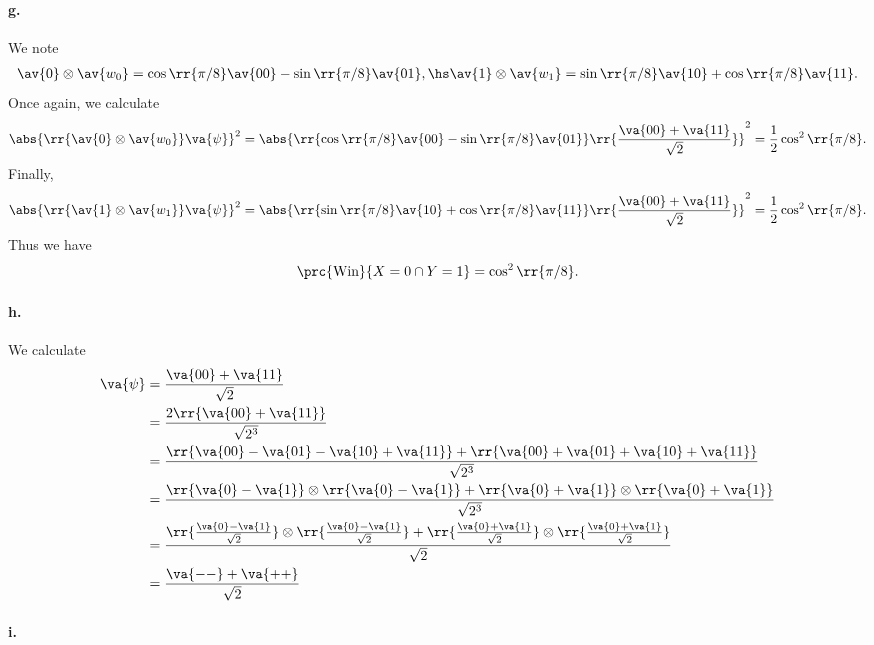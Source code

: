 \documentclass{article}
\begin{document}
\paragraph{g.} We note
\begin{align*}
  \av{0}\otimes \av{w_0} = \cos\rr{\pi/8} \av{00} - \sin\rr{\pi/8}\av{01} , \hs
  \av{1}\otimes \av{w_1} = \sin\rr{\pi/8}\av{10} + \cos\rr{\pi/8} \av{11}.
\end{align*}
Once again, we calculate
\begin{align*}
  \abs{\rr{\av{0}\otimes\av{w_0}}\va{\psi}}^2
  = \abs{\rr{\cos\rr{\pi/8} \av{00} - \sin\rr{\pi/8}\av{01}}\rr{\frac{\va{00}+\va{11}}{\sqrt{2}}}}^2
  =\frac{1}{2}\cos^2\rr{\pi/8}.
\end{align*}
Finally,
\begin{align*}
  \abs{\rr{\av{1}\otimes\av{w_1}}\va{\psi}}^2
  = \abs{\rr{\sin\rr{\pi/8}\av{10} + \cos\rr{\pi/8} \av{11}}\rr{\frac{\va{00}+\va{11}}{\sqrt{2}}}}^2
  =\frac{1}{2}\cos^2\rr{\pi/8}.
\end{align*}
Thus we have
\begin{align*}
  \prc{\text{Win}}{X=0\cap Y=1} = \cos^2\rr{\pi/8}.
\end{align*}

\paragraph{h.}

We calculate
\begin{align*}
  \va{\psi}
  &= \frac{\va{00} + \va{11}}{\sqrt{2}} \\
  &= \frac{2\rr{\va{00} + \va{11}}}{\sqrt{2^3}} \\
  &= \frac{\rr{\va{00}-\va{01}-\va{10}+\va{11}} + \rr{\va{00}+\va{01}+\va{10}+\va{11}}}{\sqrt{2^3}} \\
  &= \frac{\rr{\va{0}-\va{1}}\otimes \rr{\va{0}-\va{1}} + \rr{\va{0}+\va{1}}\otimes \rr{\va{0}+\va{1}}}{\sqrt{2^3}} \\
  &= \frac{\rr{\frac{\va{0}-\va{1}}{\sqrt{2}}}\otimes \rr{\frac{\va{0}-\va{1}}{\sqrt{2}}} + \rr{\frac{\va{0}+\va{1}}{\sqrt{2}}}\otimes \rr{\frac{\va{0}+\va{1}}{\sqrt{2}}}}{\sqrt{2}} \\
  &= \frac{\va{--} + \va{++}}{\sqrt{2}}
\end{align*}

\paragraph{i.}
\end{document}
